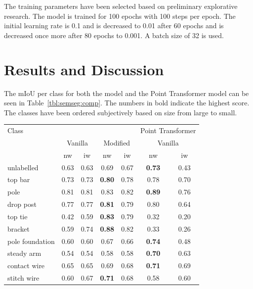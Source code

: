 The training parameters have been selected based on preliminary explorative research. The model is trained for 100 epochs with 100 steps per epoch. The initial learning rate is 0.1 and is decreased to 0.01 after 60 epochs and is decreased once more after 80 epochs to 0.001. A batch size of 32 is used.

\section{Results and Discussion} \label{sec:semseg:results}
The mIoU per class for both the \pnpp{} model and the Point Transformer model can be seen in Table~\ref{tbl:semseg:comp}. The numbers in bold indicate the highest score. The classes have been ordered subjectively based on size from large to small.

\begin{table}[ht]
    \centering
    \begin{tabular}{lcccccc}
        \toprule
        Class & \multicolumn{4}{c}{\pnpp{}} & \multicolumn{2}{c}{Point Transformer}\\
        \cmidrule(lr){2-5} \cmidrule(lr){6-7}
        & \multicolumn{2}{c}{Vanilla} & \multicolumn{2}{c}{Modified} & \multicolumn{2}{c}{Vanilla}\\
        \cmidrule(lr){2-3} \cmidrule(lr){4-5} \cmidrule(lr){6-7}
        & nw & iw & nw & iw & nw & iw\\
        \midrule
        unlabelled & 0.63 & 0.63 & 0.69 & 0.67 & \textbf{0.73}& 0.43\\
        top bar & 0.73 & 0.73 & \textbf{0.80} & 0.78 & 0.78 & 0.70\\
        pole & 0.81 & 0.81  & 0.83 & 0.82 & \textbf{0.89} & 0.76\\
        drop post &  0.77 & 0.77  & \textbf{0.81} & 0.79 & 0.80 & 0.64\\
        top tie & 0.42 & 0.59  & \textbf{0.83} & 0.79 & 0.32 & 0.20\\
        bracket & 0.59 & 0.74  & \textbf{0.88} & 0.82 & 0.33 & 0.26\\
        pole foundation & 0.60 & 0.60  & 0.67 & 0.66 & \textbf{0.74} & 0.48\\
        steady arm & 0.54 & 0.54  & 0.58 & 0.58 &\textbf{0.70} & 0.63\\
        contact wire & 0.65 & 0.65  & 0.69 & 0.68 &\textbf{0.71} & 0.69\\
        stitch wire & 0.60 & 0.67  & \textbf{0.71} & 0.68 & 0.58 & 0.60\\

\end{tabular}
\end{table}

